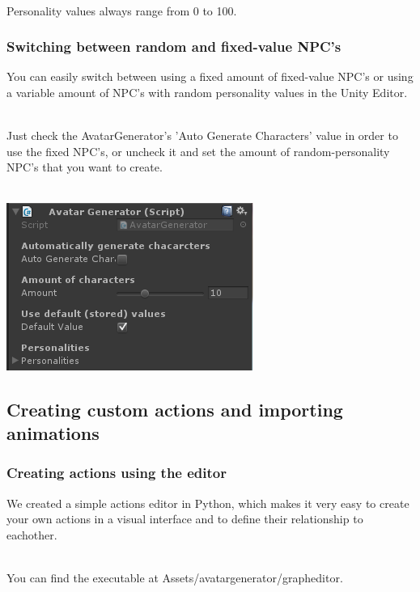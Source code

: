 \documentclass[11pt]{article} %
\begin{document}
~\\
Personality values always range from 0 to 100.



\newpage
\subsubsection{Switching between random and fixed-value NPC's}
You can easily switch between using a fixed amount of fixed-value NPC's or using a variable amount of NPC's with random personality values in the Unity Editor. 

~\\
Just check the AvatarGenerator's 'Auto Generate Characters' value in order to use the fixed NPC's, or uncheck it and set the amount of random-personality NPC's that you want to create.

~\\
\includegraphics{12}

\newpage
\subsection{Creating custom actions and importing animations}
\subsubsection{Creating actions using the editor}
We created a simple actions editor in Python, which makes it very easy to create your own actions in a visual interface and to define their relationship to eachother.

~\\
You can find the executable at Assets/avatargenerator/grapheditor. 
\end{document}
